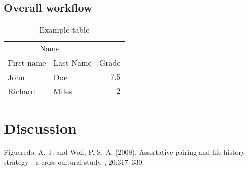 \documentclass[twoside]{article}
\begin{document}
\begin{multicols}{2}
\subsection{Overall workflow}

\begin{table}[H]
\caption{Example table}
\centering
\begin{tabular}{llr}
\toprule
\multicolumn{2}{c}{Name} \\
\cmidrule(r){1-2}
First name & Last Name & Grade \\
\midrule
John & Doe & $7.5$ \\
Richard & Miles & $2$ \\
\bottomrule
\end{tabular}
\end{table}



\section{Discussion}

\lipsum[7-8] %


\begin{thebibliography}{99} %

Figueredo, A.~J. and Wolf, P. S.~A. (2009).
\newblock Assortative pairing and life history strategy - a cross-cultural
  study.
, 20:317--330.
 
\end{thebibliography}


\end{multicols}
\end{document}
